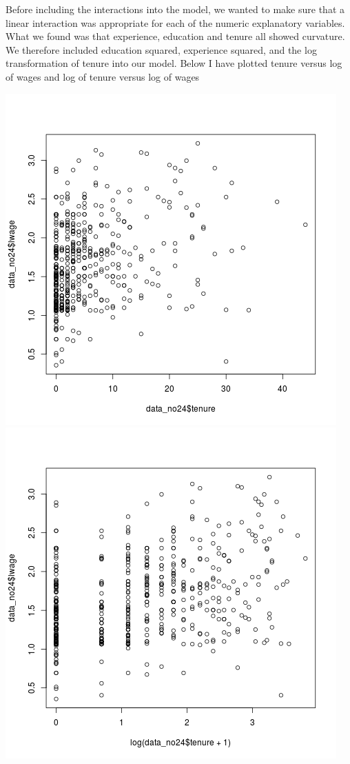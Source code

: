\documentclass[12pt,a4paper,twoside]{article}
\begin{document}
Before including the interactions into the model, we wanted to make sure that a linear interaction was appropriate for each of the numeric explanatory variables. What we found was that experience, education and tenure all showed curvature. We therefore included education squared, experience squared, and the log transformation of tenure into our model. Below I have plotted tenure versus log of wages and log of tenure versus log of wages\\
\begin{center}
\includegraphics[scale=.4]{tenure.png}
\includegraphics[scale=.4]{logtenure.png}
\end{center}
\end{document}
